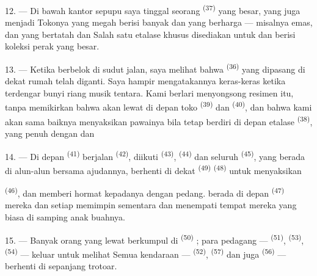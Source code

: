12. --- Di bawah kantor sepupu saya tinggal seorang  \textsuperscript{(37)} yang besar, yang juga menjadi
 Tokonya yang megah berisi banyak   dan  yang
berharga — misalnya   emas,
 dan  yang bertatah 
dan  Salah satu etalase khusus disediakan untuk
 dan berisi koleksi  perak yang
besar.

13. --- Ketika berbelok di sudut jalan, saya melihat bahwa
 \textsuperscript{(36)} yang dipasang di dekat
 rumah telah diganti. Saya hampir mengatakannya
keras-keras ketika terdengar bunyi riang  musik tentara.
Kami berlari menyongsong resimen itu, tanpa memikirkan bahwa
 akan lewat di depan toko 
\textsuperscript{(39)} dan 
\textsuperscript{(40)}, dan bahwa kami akan sama baiknya menyaksikan
pawainya bila tetap berdiri di depan etalase 
\textsuperscript{(38)}, yang penuh dengan  dan 

\VUsaut{3.0mm}

14. --- Di depan  \textsuperscript{(41)} berjalan
 \textsuperscript{(42)}, diikuti  \textsuperscript{(43)}, 
\textsuperscript{(44)} dan seluruh 
 \textsuperscript{(45)}, yang berada di alun-alun
bersama ajudannya, berhenti di dekat 
\textsuperscript{(49)}  \textsuperscript{(48)} untuk
menyaksikan 

 \textsuperscript{(46)},  dan
 memberi hormat kepadanya dengan pedang.
 berada di depan 
\textsuperscript{(47)} mereka dan setiap  memimpin
 sementara  
dan  menempati tempat mereka yang biasa di samping
anak buahnya.

15. --- Banyak orang yang lewat berkumpul di 
\textsuperscript{(50)} ; para pedagang — 
\textsuperscript{(51)},  \textsuperscript{(53)},
 \textsuperscript{(54)} — keluar untuk melihat
 Semua kendaraan — 
\textsuperscript{(52)},  \textsuperscript{(57)}
dan juga  \textsuperscript{(56)} — berhenti di
sepanjang trotoar.

